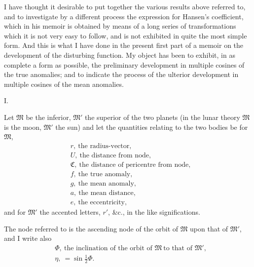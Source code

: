 \documentclass[12pt,a4paper]{article}
\theoremstyle{plain}
\begin{document}
\medskip

I have thought it desirable to put together the various results above referred to, and to investigate by a different process the expression for Hansen's coefficient, which in his memoir is obtained by means of a long series of transformations which it is not very easy to follow, and is not exhibited in quite the most simple form. And this is what I have done in the present first part of a memoir on the development of the disturbing function. My object has been to exhibit, in as complete a form as possible, the preliminary development in multiple cosines of the true anomalies; and to indicate the process of the ulterior development in multiple cosines of the mean anomalies.

\newpage
{}

\begin{center}\textsc{I.}\end{center}

Let $\mathfrak{M}$ be the inferior, $\mathfrak{M}'$ the superior of the two planets (in the lunar theory $\mathfrak{M}$ is the moon, $\mathfrak{M}'$ the sun) and let the quantities relating to the two bodies be for $\mathfrak{M}$,
\begin{align*}
&r,\ \text{the radius-vector},\\
&U,\ \text{the distance from node},\\
&\mathfrak{C},\ \text{the distance of pericentre from node},\\
&f,\ \text{the true anomaly},\\
&g,\ \text{the mean anomaly},\\
&a,\ \text{the mean distance},\\
&e,\ \text{the eccentricity},
\end{align*}
and for $\mathfrak{M}'$ the accented letters, $r'$, \&c., in the like significations.

The node referred to is the ascending node of the orbit of $\mathfrak{M}$ upon that of $\mathfrak{M}'$, and I write also
\begin{align*}
&\Phi,\ \text{the inclination of the orbit of }\mathfrak{M}\ \text{to that of }\mathfrak{M}',\\
&\eta,\ =\sin\tfrac{1}{2}\Phi.
\end{align*}
\end{document}
